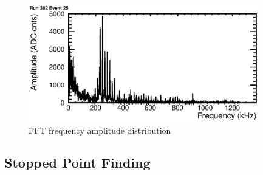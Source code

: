 \begin{figure}[htbp]
 \begin{center}
  \includegraphics[width=100mm]{fig/FFT.eps}
 \end{center}
 \caption{FFT frequency amplitude distribution}
 \label{Fig:beforeFFT}
\end{figure}




\subsection{Stopped Point Finding}
%


